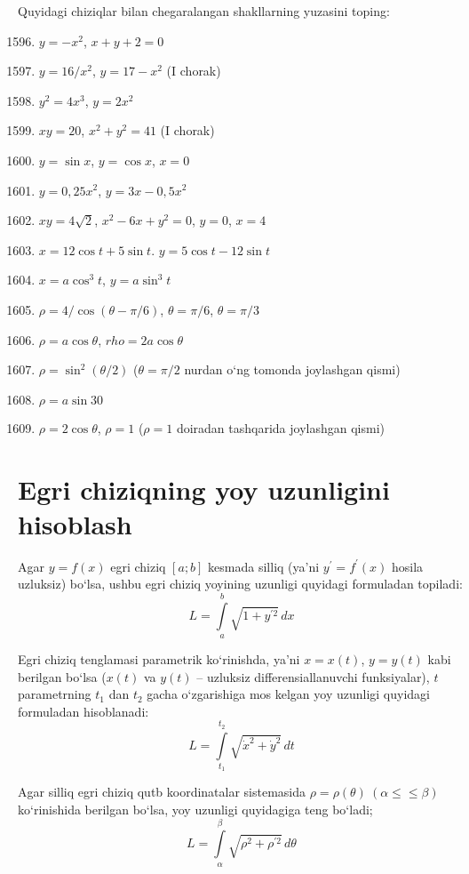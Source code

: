 Quyidagi chiziqlar bilan chegaralangan shakllarning yuzasini toping:
\begin{enumerate}\setcounter{enumi}{1595}
	\item $y=-x^2$, $x+y+2=0$
	\item $y=16/x^2$, $y=17-x^2$ (I chorak)
	\item $y^2=4x^3$, $y=2x^2$
	\item $xy=20$, $x^2+y^2=41$ (I chorak)
	\item $y=\sin x$, $y=\cos x$, $x=0$
	\item $y=0,25x^2$, $y=3x-0,5x^2$
	\item $xy=4\sqrt{2}$, $x^2-6x+y^2=0$, $y=0$, $x=4$
	\item $x=12\cos t+5\sin t$. $y=5\cos t-12\sin t$
	\item $x=a\cos^3 t$, $y=a\sin^3 t$
	\item $\rho=4/\cos(\theta-\pi/6)$, $\theta=\pi/6$, $\theta=\pi/3$
	\item $\rho=a\cos\theta$, $rho=2a\cos\theta$
	\item $\rho=\sin^2(\theta/2)$ ($\theta=\pi/2$ nurdan o`ng tomonda joylashgan qismi)
	\item $\rho=a\sin30$
	\item $\rho=2\cos\theta$, $\rho=1$ ($\rho=1$ doiradan tashqarida joylashgan qismi)
\end{enumerate}








\section{Egri chiziqning yoy uzunligini hisoblash}
Agar $y=f(x)$ egri chiziq $[a;b]$ kesmada silliq  (ya'ni $y^\prime=f^\prime(x)$ hosila uzluksiz) bo`lsa, ushbu egri chiziq yoyining uzunligi quyidagi formuladan topiladi:
$$L=\int\limits_a^b\sqrt{1+y^{\prime2}}\,dx$$

Egri chiziq tenglamasi parametrik ko`rinishda, ya'ni $x=x(t)$, $y=y(t)$ kabi berilgan bo`lsa ($x(t)$ va $y(t)$ -- uzluksiz differensiallanuvchi funksiyalar), $t$ parametrning $t_1$ dan $t_2$ gacha o`zgarishiga mos kelgan yoy uzunligi quyidagi formuladan hisoblanadi:
$$L=\int\limits_{t_{1}}^{t_2}\sqrt{\dot x^2+\dot y^2}\,dt$$ 

Agar silliq egri chiziq qutb koordinatalar sistemasida $\rho=\rho(\theta)\ (\alpha\le\le\beta)$ ko`rinishida  berilgan bo`lsa, yoy uzunligi quyidagiga teng bo`ladi;
$$L=\int\limits_\alpha^\beta\sqrt{\rho^2+\rho^{\prime2}}\,d\theta$$

